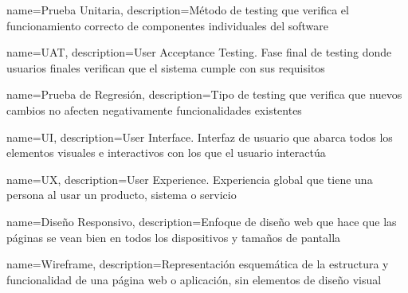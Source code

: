 {
    name={Prueba Unitaria},
    description={Método de testing que verifica el funcionamiento correcto de componentes individuales del software}
}

{
    name={UAT},
    description={User Acceptance Testing. Fase final de testing donde usuarios finales verifican que el sistema cumple con sus requisitos}
}

{
    name={Prueba de Regresión},
    description={Tipo de testing que verifica que nuevos cambios no afecten negativamente funcionalidades existentes}
}


{
    name={UI},
    description={User Interface. Interfaz de usuario que abarca todos los elementos visuales e interactivos con los que el usuario interactúa}
}

{
    name={UX},
    description={User Experience. Experiencia global que tiene una persona al usar un producto, sistema o servicio}
}

{
    name={Diseño Responsivo},
    description={Enfoque de diseño web que hace que las páginas se vean bien en todos los dispositivos y tamaños de pantalla}
}

{
    name={Wireframe},
    description={Representación esquemática de la estructura y funcionalidad de una página web o aplicación, sin elementos de diseño visual}
}

